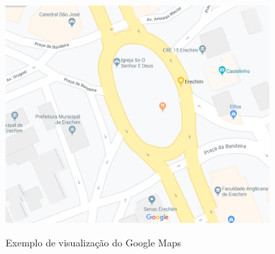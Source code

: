 \begin{figure}[H]
    \centering
    \caption{Exemplo de visualização do Google Maps}
    \includegraphics[width=0.9\textwidth]{./dados/figuras/fig4}
    \label{fig:figura-googlemaps}
\end{figure}


